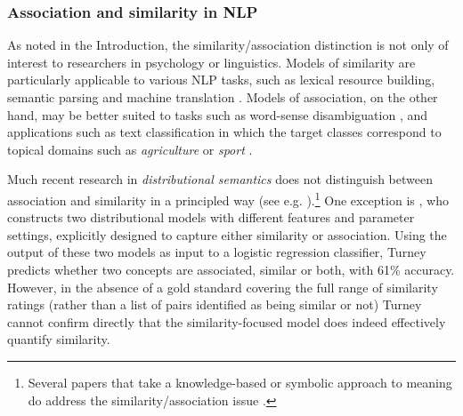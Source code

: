 

\subsubsection{Association and similarity in NLP} 

As noted in the Introduction, the similarity/association distinction is not only of interest to researchers in psychology or linguistics. Models of similarity are particularly applicable to various NLP tasks, such as lexical resource building, semantic parsing and machine translation \cite{he2008indirect,Haghighi2008Learning,marton2009improved,beltagysemantic}. Models of association, on the other hand, may be better suited to tasks such as word-sense disambiguation \cite{navigli2009word}, and applications such as text classification \cite{phan2008learning} in which the target classes correspond to topical domains such as \emph{agriculture} or \emph{sport} \cite{rose2002reuters}. 

Much recent research in \emph{distributional semantics} does not distinguish between association and similarity in a principled way (see e.g. \cite{huang2012improving,reisinger2010multi,luong2013better}).\footnote{Several papers that take a knowledge-based or symbolic approach to meaning do address the similarity/association issue \cite{budanitsky2006evaluating}.} One exception is \cite{turney2012domain}, who constructs two distributional models with different features and parameter settings, explicitly designed to capture either similarity or association. Using the output of these two models as input to a logistic regression classifier, Turney predicts whether two concepts are associated, similar or both, with 61\% accuracy. However, in the absence of a gold standard covering the full range of similarity ratings (rather than a list of pairs identified as being similar or not) Turney cannot confirm directly that the similarity-focused model does indeed effectively quantify similarity. 

